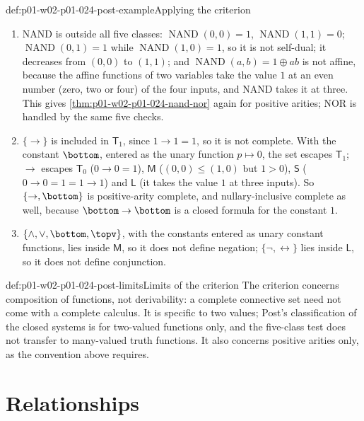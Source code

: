 \begin{hbexample}{def:p01-w02-p01-024-post-example}{Applying the criterion}
\begin{enumerate}
\item NAND is outside all five classes: \(\operatorname{NAND}(0,0)=1\),
  \(\operatorname{NAND}(1,1)=0\); \(\operatorname{NAND}(0,1)=1\) while
  \(\operatorname{NAND}(1,0)=1\), so it is not self-dual; it decreases from
  \((0,0)\) to \((1,1)\); and \(\operatorname{NAND}(a,b)=1\oplus ab\) is not
  affine, because the affine functions of two variables take the value \(1\)
  at an even number (zero, two or four) of the four inputs, and NAND takes
  it at three.  This gives \cref{thm:p01-w02-p01-024-nand-nor} again for
  positive arities; NOR is handled by the same five checks.
\item \(\{\to\}\) is included in \(\mathsf T_1\), since \(1\to1=1\), so it
  is not complete.  With the constant \(\bottom\), entered as the unary
  function \(p\mapsto0\), the set escapes \(\mathsf T_1\); \(\to\) escapes
  \(\mathsf T_0\) (\(0\to0=1\)), \(\mathsf M\) (\((0,0)\leq(1,0)\) but
  \(1>0\)), \(\mathsf S\) (\(0\to0=1=1\to1\)) and \(\mathsf L\) (it takes
  the value \(1\) at three inputs).  So \(\{\to,\bottom\}\) is positive-arity
  complete, and nullary-inclusive complete as well, because
  \(\bottom\to\bottom\) is a closed formula for the constant \(1\).
\item \(\{\land,\lor,\bottom,\topv\}\), with the constants entered as unary
  constant functions, lies inside \(\mathsf M\), so it does not define
  negation; \(\{\neg,\leftrightarrow\}\) lies inside \(\mathsf L\), so it
  does not define conjunction.
\end{enumerate}
\end{hbexample}

\begin{hbwarning}{def:p01-w02-p01-024-post-limits}{Limits of the criterion}
The criterion concerns composition of functions, not derivability: a
complete connective set need not come with a complete calculus.  It is
specific to two values; Post's classification of the closed systems is
for two-valued functions only, and the five-class test does not transfer to
many-valued truth functions.  It also concerns positive arities only, as
the convention above requires.
\end{hbwarning}

\section{Relationships}
\label{sec:p01-w02-p01-024-relationships}


